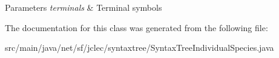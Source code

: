 \begin{DoxyParams}{Parameters}
{\em terminals} & Terminal symbols \\
\hline
\end{DoxyParams}


The documentation for this class was generated from the following file\-:\begin{DoxyCompactItemize}
\item 
src/main/java/net/sf/jclec/syntaxtree/Syntax\-Tree\-Individual\-Species.\-java\end{DoxyCompactItemize}
